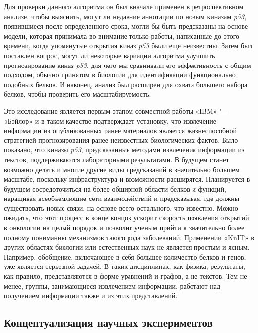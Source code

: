Для проверки данного алгоритма он был вначале применен в ретроспективном анализе, чтобы выяснить, могут ли недавние 
аннотации по новым киназам \textit{p53}, появившиеся после определенного срока, могли бы быть предсказаны на основе 
модели, которая принимала во внимание только работы, написанные до этого времени, когда упомянутые открытия киназ 
\textit{p53} были еще неизвестны. Затем был поставлен вопрос, могут ли некоторые вариации алгоритма улучшить 
прогнозирование киназ \textit{p53}, для чего мы сравнивали его эффективность с общим подходом, обычно принятом в 
биологии для идентификации функционально подобных белков. И наконец, анализ был расширен для охвата большего набора 
белков, чтобы проверить его масштабируемость.

Это исследование является первым этапом совместной работы «IBM» "--- «Бэйлор» и в таком качестве подтверждает 
установку, что извлечение информации из опубликованных ранее материалов является жизнеспособной стратегией 
прогнозирования ранее неизвестных биологических фактов. Было показано, что киназы \textit{p53}, предсказанные методами 
извлечения информации из текстов, поддерживаются лабораторными результатами. В будущем станет возможно делать и многие 
другие виды предсказаний в значительно большем масштабе, поскольку инфраструктура и возможности расширятся. Планируется 
в будущем сосредоточиться на более обширной области белков и функций, наращивая всеобъемлющие сети взаимодействий и 
предсказывая, где должны существовать новые связи, на основе всего остального, что известно. Можно ожидать, что этот 
процесс в конце концов ускорит скорость появления открытий в онкологии на целый порядок и позволит ученым прийти к 
значительно более полному пониманию механизмов такого рода заболеваний. Применении «KnIT» в других областях биологии 
или естественных наук не является простым и ясным. Например, обобщение, включающее в себя большее количество белков и 
генов, уже является серьезной задачей. В таких дисциплинах, как физика, результаты, как правило, представляются в форме 
уравнений и графов, а не текстов. Тем не менее, группы, занимающиеся извлечением информации, работают над получением 
информации также и из этих представлений.

\subsection{Концептуализация научных экспериментов}\label{sect1_2_6}

